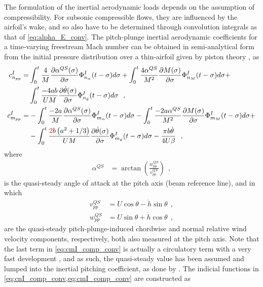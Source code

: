 \documentclass[12pt,a4paper,oneside,english]{abntex2} %
\newcommand{\fix}[1]{{\color{red}#1}}
\newcommand{\del}[2]{\frac{\partial#1}{\partial#2}}
\def\lp{\left(}
\def\rp{\right)}
\def\thetadot{\dot{\theta}}
\def\hdot{\dot{h}}
\begin{document}
The formulation of the inertial aerodynamic loads depends on the assumption of compressibility. For subsonic compressible flows, they are influenced by the airfoil's wake, and so also have to be determined through convolution integrals as that of \cref{eq:alpha_E_conv}. The pitch-plunge inertial aerodynamic coefficients for a time-varying freestream Mach number can be obtained in semi-analytical form from the initial pressure distribution over a thin-airfoil given by piston theory \cite{jose2005unsteady}, as
\begin{align}
    c_{n_{pp}}^I =& \int_0^t \frac{4}{M} \del{\alpha^{QS}(\sigma)}{\sigma} \Phi_{n_\alpha}^I(t-\sigma) d\sigma + \int_0^t \frac{4\alpha^{QS}}{M^2} \del{M(\sigma)}{\sigma} \Phi_{n_M}^I(t-\sigma) d\sigma + \nonumber 
    \\
    & \int_0^t\frac{-4ab}{UM} \del{\thetadot(\sigma)}{\sigma} \Phi_{n_{\thetadot}}^I(t-\sigma) d\sigma 
    \ \ , \label{eq:cnI_comp_conv}
    \\
    c_{m_{pp}}^I =& -\int_0^t \frac{-2a}{M} \del{\alpha^{QS}(\sigma)}{\sigma} \Phi_{m_\alpha}^I(t-\sigma) d\sigma - \int_0^t \frac{-2a\alpha^{QS}}{M^2} \del{M(\sigma)}{\sigma} \Phi_{m_M}^I(t-\sigma) d\sigma + \nonumber 
    \\
    & -\int_0^t\frac{\fix{2}b\lp a^2+1/3\rp}{UM} \del{\thetadot(\sigma)}{\sigma} \Phi_{m_{\thetadot}}^I(t-\sigma) d\sigma - \frac{\pi b\thetadot}{4U\beta} \ \ ,
    \label{eq:cmI_comp_conv}
\end{align}
where
\begin{align}
    \alpha^{QS} &= \arctan\lp\frac{w_{pp}^{QS}}{v_{pp}^{QS}} \rp \ \ ,
    \label{eq:alpha_pp_QS}
\end{align}
is the quasi-steady angle of attack at the pitch axis (beam reference line), and in which
\begin{align}
    v_{pp}^{QS} &= U\cos\theta-\hdot\sin\theta
    \ \ , \label{eq:v_pp_QS}
    \\
    w_{pp}^{QS} &= U\sin\theta+\hdot\cos\theta \ \ ,
    \label{eq:w_pp_QS}    
\end{align}
are the quasi-steady pitch-plunge-induced chordwise and normal relative wind velocity components, respectively, both also measured at the pitch axis. Note that the last term in \cref{eq:cmI_comp_conv} is actually a circulatory term with a very fast development \cite{jose2005unsteady}, and as such, the quasi-steady value has been assumed and lumped into the inertial pitching coefficient, as done by . The indicial functions in \cref{eq:cnI_comp_conv,eq:cmI_comp_conv} are constructed as
\end{document}
